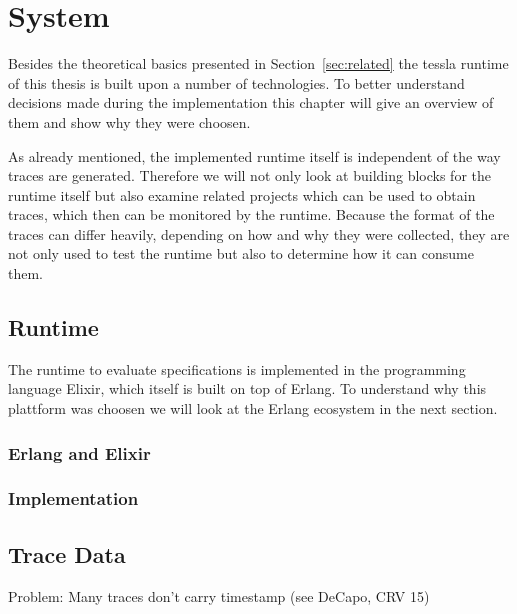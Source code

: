 %
\chapter{System}
\label{sec:system}

Besides the theoretical basics presented in Section~\ref{sec:related} the \gls{tessla} runtime of this thesis is built upon a number of technologies.
To better understand decisions made during the implementation this chapter will give an overview of them and show why they were choosen.

As already mentioned, the implemented runtime itself is independent of the way traces are generated.
Therefore we will not only look at building blocks for the runtime itself but also examine related projects which can be used to obtain traces, which then can be monitored by the runtime.
Because the format of the traces can differ heavily, depending on how and why they were collected, they are not only used to test the runtime but also to determine how it can consume them.

\section{ Runtime}
\label{sec:system:runtime}

The runtime to evaluate specifications is implemented in the programming language Elixir, which itself is built on top of Erlang.
To understand why this plattform was choosen we will look at the Erlang ecosystem in the next section.

\subsection{Erlang and Elixir}
\label{sec:system:eval_engine:erlang_elixir}
\subsection{Implementation}

\section{Trace Data}
\label{sec:system:traces}

Problem: Many traces don't carry timestamp (see DeCapo, CRV 15)

